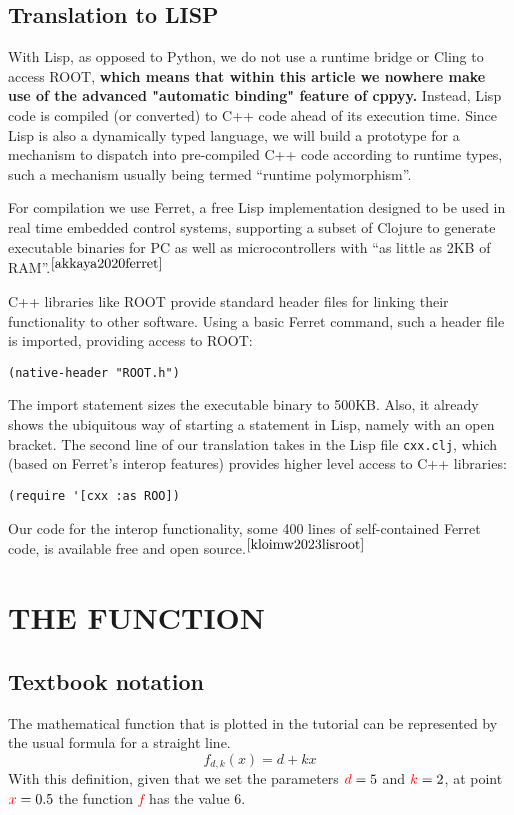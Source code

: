 \documentclass[twocolumn]{article}
\begin{document}
\subsection{Translation to LISP}
With Lisp, as opposed to Python, we do not use a runtime bridge or Cling to access ROOT, \textbf{which means that within this article we nowhere make use of the advanced "automatic binding" feature of cppyy.} Instead, Lisp code is compiled (or converted) to C++ code ahead of its execution time. Since Lisp is also a dynamically typed language, we will build a prototype for a mechanism to dispatch into pre-compiled C++ code according to runtime types, such a mechanism usually being termed “runtime polymorphism”.

For compilation we use Ferret, a free Lisp implementation designed to be used in real time embedded control systems, supporting a subset of Clojure  to generate executable binaries for PC as well as microcontrollers with “as little as 2KB of RAM”.$^{\cite{akkaya2020ferret}}$

C++ libraries like ROOT provide standard header files for linking their functionality to other software. Using a basic Ferret command, such a header file is imported, providing access to ROOT:
{\color{blue}\begin{verbatim}
(native-header "ROOT.h")
\end{verbatim}}
The import statement sizes the executable binary to 500KB. Also, it already shows the ubiquitous way of starting a statement in Lisp, namely with an open bracket. The second line of our translation takes in the Lisp file \texttt{cxx.clj}, which (based on Ferret’s interop features) provides higher level access to C++ libraries:
{\color{blue}\begin{verbatim}
(require '[cxx :as ROO])
\end{verbatim}}
Our code for the interop functionality, some 400 lines of self-contained Ferret code, is available free and open source.$^{\cite{kloimw2023lisroot}}$

\section{THE FUNCTION}
\subsection{Textbook notation}
The mathematical function that is plotted in the tutorial can be represented by the usual formula for a straight line.
{\color{red}
\begin{equation}
f_{d,k}(x)=d+kx
\end{equation}}
With this definition, given that we set the parameters \(\textcolor{red}{d} = 5\) and \(\textcolor{red}{k} = 2\), at point \(\textcolor{red}{x} = 0.5\) the function \textcolor{red}{$f$} has the value 6.
\end{document}
